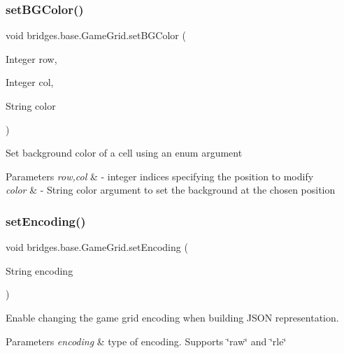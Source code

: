 \subsubsection{\texorpdfstring{setBGColor()}{setBGColor()}\hspace{0.1cm}{\footnotesize\ttfamily [2/2]}}
{\footnotesize\ttfamily void bridges.\+base.\+Game\+Grid.\+set\+B\+G\+Color (\begin{DoxyParamCaption}\item[{Integer}]{row,  }\item[{Integer}]{col,  }\item[{String}]{color }\end{DoxyParamCaption})}

Set background color of a cell using an enum argument


\begin{DoxyParams}{Parameters}
{\em row,col} & -\/ integer indices specifying the position to modify \\
\hline
{\em color} & -\/ String color argument to set the background at the chosen position \\
\hline
\end{DoxyParams}
\mbox{\label{classbridges_1_1base_1_1_game_grid_a2281cfd7d61dc9903c9b1358c9767a1e}} 
\subsubsection{\texorpdfstring{setEncoding()}{setEncoding()}}
{\footnotesize\ttfamily void bridges.\+base.\+Game\+Grid.\+set\+Encoding (\begin{DoxyParamCaption}\item[{String}]{encoding }\end{DoxyParamCaption})}



Enable changing the game grid encoding when building J\+S\+ON representation. 


\begin{DoxyParams}{Parameters}
{\em encoding} & type of encoding. Supports \char`\"{}raw\char`\"{} and \char`\"{}rle\char`\"{} \\
\hline
\end{DoxyParams}
\mbox{\label{classbridges_1_1base_1_1_game_grid_a105b46f68bcc9413889e7255318bab4c}} 
